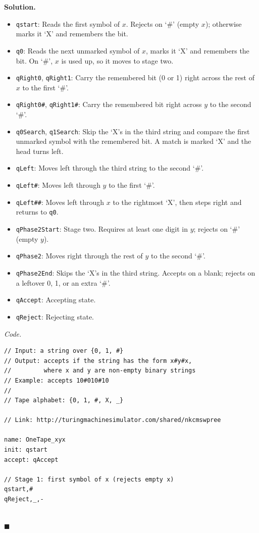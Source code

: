 \documentclass[11pt]{article}
\newenvironment{solution}{%
  \par\noindent\textbf{Solution.}\ \normalfont
}{\hfill$\blacksquare$\par\medskip}
\theoremstyle{plain}
\theoremstyle{definition}
\begin{document}
\begin{solution}
\begin{itemize}
  \item \texttt{qstart}: Reads the first symbol of $x$. Rejects on `\#' (empty $x$); otherwise marks it `X' and remembers the bit.
  \item \texttt{q0}: Reads the next unmarked symbol of $x$, marks it `X' and remembers the bit. On `\#', $x$ is used up, so it moves to stage two.
  \item \texttt{qRight0}, \texttt{qRight1}: Carry the remembered bit (0 or 1) right across the rest of $x$ to the first `\#'.
  \item \texttt{qRight0\#}, \texttt{qRight1\#}: Carry the remembered bit right across $y$ to the second `\#'.
  \item \texttt{q0Search}, \texttt{q1Search}: Skip the `X's in the third string and compare the first unmarked symbol with the remembered bit. A match is marked `X' and the head turns left.
  \item \texttt{qLeft}: Moves left through the third string to the second `\#'.
  \item \texttt{qLeft\#}: Moves left through $y$ to the first `\#'.
  \item \texttt{qLeft\#\#}: Moves left through $x$ to the rightmost `X', then steps right and returns to \texttt{q0}.
  \item \texttt{qPhase2Start}: Stage two. Requires at least one digit in $y$; rejects on `\#' (empty $y$).
  \item \texttt{qPhase2}: Moves right through the rest of $y$ to the second `\#'.
  \item \texttt{qPhase2End}: Skips the `X's in the third string. Accepts on a blank; rejects on a leftover 0, 1, or an extra `\#'.
  \item \texttt{qAccept}: Accepting state.
  \item \texttt{qReject}: Rejecting state.
\end{itemize}

\emph{Code.}
\begin{lstlisting}
// Input: a string over {0, 1, #}
// Output: accepts if the string has the form x#y#x,
//         where x and y are non-empty binary strings
// Example: accepts 10#010#10
//
// Tape alphabet: {0, 1, #, X, _}

// Link: http://turingmachinesimulator.com/shared/nkcmswpree

name: OneTape_xyx
init: qstart
accept: qAccept

// Stage 1: first symbol of x (rejects empty x)
qstart,#
qReject,_,-


\end{lstlisting}
\end{solution}
\end{document}
